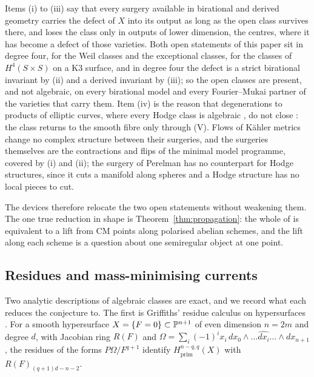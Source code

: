 Items (i) to (iii) say that every surgery available in birational and derived geometry carries the defect of $X$ into its output as long as the open class survives there, and loses the class only in outputs of lower dimension, the centres, where it has become a defect of those varieties. Both open statements of this paper sit in degree four, \Fii{} for the Weil classes and the exceptional classes, \Fiii{} for the classes of $H^{4}(S\times S)$ on a K3 surface, and in degree four the defect is a strict birational invariant by (ii) and a derived invariant by (iii); so the open classes are present, and not algebraic, on every birational model and every Fourier--Mukai partner of the varieties that carry them. Item (iv) is the reason that degenerations to products of elliptic curves, where every Hodge class is algebraic \cite{MZ99}, do not close \Fii{}: the class returns to the smooth fibre only through (V). Flows of K\"ahler metrics change no complex structure between their surgeries, and the surgeries themselves are the contractions and flips of the minimal model programme, covered by (i) and (ii); the surgery of Perelman has no counterpart for Hodge structures, since it cuts a manifold along spheres and a Hodge structure has no local pieces to cut.

The devices therefore relocate the two open statements without weakening them. The one true reduction in shape is Theorem~\ref{thm:propagation}: the whole of \Fii{} is equivalent to a lift from CM points along polarised abelian schemes, and the lift along each scheme is a question about one semiregular object at one point.

\subsection{Residues and mass-minimising currents}\label{ssec:analytic}

Two analytic descriptions of algebraic classes are exact, and we record what each reduces the conjecture to. The first is Griffiths' residue calculus on hypersurfaces \cite{Gri69}. For a smooth hypersurface $X=\{F=0\}\subset\mathbb{P}^{n+1}$ of even dimension $n=2m$ and degree $d$, with Jacobian ring $R(F)$ and $\Omega=\sum_{i}(-1)^{i}x_{i}\,dx_{0}\wedge\dots\widehat{dx_{i}}\dots\wedge dx_{n+1}$, the residues of the forms $P\Omega/F^{q+1}$ identify $H^{n-q,q}_{\mathrm{prim}}(X)$ with $R(F)_{(q+1)d-n-2}$.


